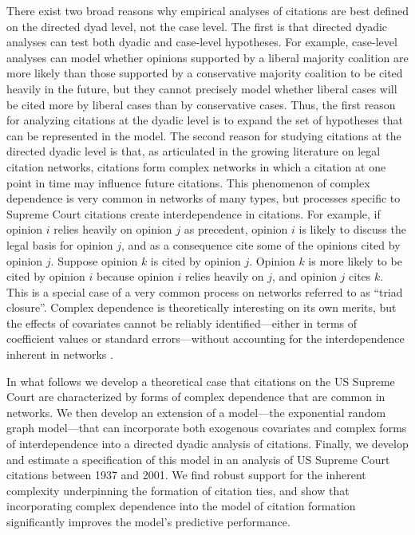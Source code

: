 \documentclass[headsepline=true, abstracton]{scrartcl}
\begin{document}
There exist two broad reasons why empirical analyses of citations are best defined on the directed dyad level, not the case level. The first is that directed dyadic analyses can test both dyadic and case-level hypotheses. For example, case-level analyses can model whether opinions supported by a liberal majority coalition are more likely than those supported by a conservative majority coalition to be cited heavily in the future, but they cannot precisely model whether liberal cases will be cited more by liberal cases than by conservative cases. Thus, the first reason for analyzing citations at the dyadic level is to expand the set of hypotheses that can be represented in the model. The second reason for studying citations at the directed dyadic level is that, as articulated in the growing literature on legal citation networks, citations form complex networks in which a citation at one point in time may influence future citations. This phenomenon of complex dependence is very common in networks of many types, but processes specific to Supreme Court citations create interdependence in citations. For example, if opinion $i$ relies heavily on opinion $j$ as precedent, opinion $i$ is likely to discuss the legal basis for opinion $j$, and as a consequence cite some of the opinions cited by opinion $j$. Suppose opinion $k$ is cited by opinion $j$. Opinion $k$ is more likely to be cited by opinion $i$ because opinion $i$ relies heavily on $j$, and opinion $j$ cites $k$.  This is a special case of a very common process on networks referred to as ``triad closure''. Complex dependence is theoretically interesting on its own merits, but the effects of covariates cannot be reliably identified---either in terms of coefficient values or standard errors---without accounting for the interdependence inherent in networks \citep{desmaraisstatistical}. 

In what follows we develop a theoretical case that citations on the US Supreme Court are characterized by forms of complex dependence that are common in networks. We then develop an extension of a model---the exponential random graph model---that can incorporate both exogenous covariates and complex forms of interdependence into a directed dyadic analysis of citations. Finally, we develop and estimate a specification of this model in an analysis of US Supreme Court citations between 1937 and 2001. We find robust support for the inherent complexity underpinning the formation of citation ties, and show that incorporating complex dependence into the model of citation formation significantly improves the model's predictive performance.
\end{document}
